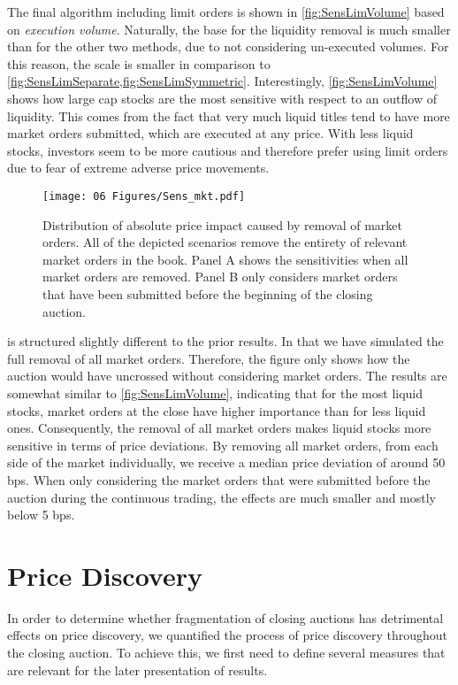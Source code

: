 \documentclass[11pt,a4paper, notitlepage]{article}
\begin{document}
	The final algorithm including limit orders is shown in \cref{fig:SensLimVolume} based on \emph{execution volume}. Naturally, the base for the liquidity removal is much smaller than for the other two methods, due to not considering un-executed volumes. For this reason, the scale is smaller in comparison to \cref{fig:SensLimSeparate,fig:SensLimSymmetric}. Interestingly, \cref{fig:SensLimVolume} shows how large cap stocks are the most sensitive with respect to an outflow of liquidity. This comes from the fact that very much liquid titles tend to have more market orders submitted, which are executed at any price. With less liquid stocks, investors seem to be more cautious and therefore prefer using limit orders due to fear of extreme adverse price movements.
	
	\begin{figure}[tp]
		\centering
		\texttt{[image: 06 Figures/Sens\_mkt.pdf]}
		\caption{Distribution of absolute price impact caused by removal of market orders. All of the depicted scenarios remove the entirety of relevant market orders in the book. Panel A shows the sensitivities when all market orders are removed. Panel B only considers market orders that have been submitted before the beginning of the closing auction.}
		\label{fig:SensMkt}
	\end{figure}
	
	 is structured slightly different to the prior results. In that we have simulated the full removal of all market orders. Therefore, the figure only shows how the auction would have uncrossed without considering market orders. The results are somewhat similar to \cref{fig:SensLimVolume}, indicating that for the most liquid stocks, market orders at the close have higher importance than for less liquid ones. Consequently, the removal of all market orders makes liquid stocks more sensitive in terms of price deviations. By removing all market orders, from each side of the market individually, we receive a median price deviation of around 50 bps. When only considering the market orders that were submitted before the auction during the continuous trading, the effects are much smaller and mostly below 5 bps.
	
	
	\section{Price Discovery} \label{sec:Discovery}
	
	In order to determine whether fragmentation of closing auctions has detrimental effects on price discovery, we quantified the process of price discovery throughout the closing auction. To achieve this, we first need to define several measures that are relevant for the later presentation of results.
	
\end{document}
